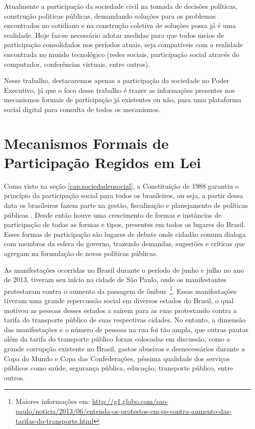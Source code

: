 Atualmente a participação da sociedade civil na tomada de decisões políticas, construção políticas públicas, demandando soluções para os problemas encontrados no cotidiano e na construção coletiva de soluções possa já é uma realidade. Hoje faz-se necessário adotar medidas para que todos meios de participação consolidados nos períodos atuais, seja compatíveis com a realidade encontrada no mundo tecnológico (redes sociais, participação social através do computador, conferências virtuais, entre outros).

Nesse trabalho, destacaremos apenas a participação da sociedade no Poder Executivo, já que o foco desse trabalho é trazer as informações presentes nos mecanismos formais de participação já existentes ou não, para uma plataforma social digital para consulta de todos os mecanismos.

\section{Mecanismos Formais de Participação Regidos em Lei}
\label{sec:mecformalpart}

Como visto na seção \ref{cap:sociedadepsocial}, a Constituição de 1988 garantiu o  princípio da participação social para todos os brasileiros, ou seja, a partir dessa data os brasileiros fazem parte na gestão, fiscalização e planejamento de políticas públicas \cite{trajano2011controle}. Desde então houve uma crescimento de formas e instâncias de participação de todas as formas e tipos, presentes em todos os lugares do Brasil. Esses formas de participação são lugares de debate onde cidadão comum dialoga com membros da esfera do governo, trazendo demandas, sugestões e críticas que agregam na formulação de novas políticas públicas. 

As manifestações ocorridas no Brasil durante o período de junho e julho no ano de 2013, tiveram seu início na cidade de São Paulo, onde os manifestantes protestaram contra o aumento da passagem de ônibus~\footnote{Maiores informações em: \url{http://g1.globo.com/sao-paulo/noticia/2013/06/entenda-os-protestos-em-sp-contra-aumento-das-tarifas-do-transporte.html}}. Essas manifestações tiveram uma grande repercussão social em diversos estados do Brasil, o qual motivou as pessoas desses estados a saírem para as ruas protestando contra a tarifa do transporte público de suas respectivas cidades. No entanto, a dimensão das manifestações e o número de pessoas na rua foi tão ampla, que outras pautas além da tarifa do transporte público foram colocadas em discussão, como a grande corrupção existente no Brasil, gastos abusivos e desnecessários durante a Copa do Mundo e Copa das Confederações, péssima qualidade dos serviços públicos como saúde, segurança pública, educação, transporte público, entre outros.

